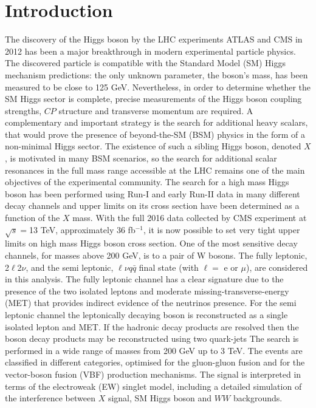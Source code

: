 \documentclass[PhD,binding=0.6cm]{../sapthesis}
\begin{document}
\chapter{Introduction}
The discovery of the Higgs boson by the LHC experiments ATLAS and CMS in 2012 has been a major breakthrough in modern experimental particle physics.
The discovered particle is compatible with the Standard Model (SM) Higgs mechanism predictions: the only unknown parameter, the boson's mass, has been
measured to be  close to 125 GeV. Nevertheless, in order to determine whether the SM Higgs sector is complete, precise measurements of the Higgs boson coupling strengths, $CP$ structure and transverse momentum are required. 
A complementary and important strategy is the search for additional heavy
scalars, that would prove the presence of  beyond-the-SM (BSM) physics in
the form of a non-minimal Higgs sector. The existence of such a sibling Higgs boson,
denoted $X$, is motivated in many BSM scenarios, so the search for additional scalar resonances in the full
mass range accessible at the LHC remains one of the main objectives of the experimental community.
The search for a high mass Higgs boson has been performed using Run-I and
early Run-II data in many different decay channels and upper limits on its cross section have been determined as a function of the $X$ mass. 
With the full 2016 data collected by CMS experiment at $\sqrt{s}=$13 TeV, approximately  36 fb$^{-1}$, 
it is now possible to set very tight upper limits on high mass Higgs boson cross section. 
One of the most sensitive decay channels, for masses above 200 GeV, is to a pair of W bosons. 
The fully leptonic, 2$\ell$2$\nu$,  and the semi leptonic, $\ell \nu q \bar{q}$ final state (with $\ell =$ e or $\mu$), are considered in this analysis.
The fully leptonic channel has a clear signature due to the presence of the two isolated leptons and moderate missing-transverse-energy (MET) that provides indirect evidence of the neutrinos presence.
For the semi leptonic channel the leptonically decaying boson is reconstructed as a single isolated lepton and MET.
If the hadronic decay products are resolved then the boson decay products may be reconstructed using two quark-jets
The search is performed in a wide range of masses from 200 GeV up to 3 TeV.
The  events are classified in  different categories, optimised for the gluon-gluon fusion and for the vector-boson fusion (VBF) production mechanisms.
The signal is interpreted in terms of the electroweak (EW) singlet model, including a detailed simulation of the interference between $X$ signal, SM Higgs boson  and $WW$ backgrounds.
\end{document}
